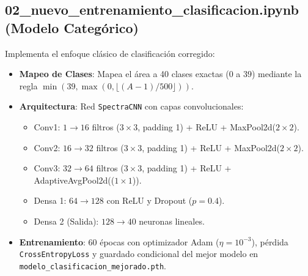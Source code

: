 \documentclass[11pt,a4paper]{article}
\begin{document}
\subsection{02\_nuevo\_entrenamiento\_clasificacion.ipynb (Modelo Categórico)}
Implementa el enfoque clásico de clasificación corregido:
\begin{itemize}
    \item \textbf{Mapeo de Clases}: Mapea el área a 40 clases exactas ($0$ a $39$) mediante la regla $\min(39, \max(0, \lfloor(A-1)/500\rfloor))$.
    \item \textbf{Arquitectura}: Red \texttt{SpectraCNN} con capas convolucionales:
    \begin{itemize}
        \item Conv1: $1 \to 16$ filtros ($3\times 3$, padding 1) + ReLU + MaxPool2d($2\times 2$).
        \item Conv2: $16 \to 32$ filtros ($3\times 3$, padding 1) + ReLU + MaxPool2d($2\times 2$).
        \item Conv3: $32 \to 64$ filtros ($3\times 3$, padding 1) + ReLU + AdaptiveAvgPool2d(($1\times 1$)).
        \item Densa 1: $64 \to 128$ con ReLU y Dropout ($p = 0.4$).
        \item Densa 2 (Salida): $128 \to 40$ neuronas lineales.
    \end{itemize}
    \item \textbf{Entrenamiento}: 60 épocas con optimizador Adam ($\eta = 10^{-3}$), pérdida \texttt{CrossEntropyLoss} y guardado condicional del mejor modelo en \texttt{modelo\_clasificacion\_mejorado.pth}.
\end{itemize}
\end{document}

